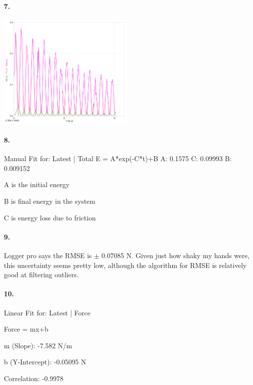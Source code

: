     \paragraph*{7.}\hbox{}

    \begin{center}
        \includegraphics[width=0.5\textwidth]{image21.png}
    \end{center}

    \paragraph*{8.}\hbox{}
    
    Manual Fit for: Latest | Total 
    E = A*exp(-C*t)+B
    A: 0.1575
    C: 0.09993
    B: 0.009152

    A is the initial energy 

    B is final energy in the system

    C is energy loss due to friction

    \paragraph*{9.}

    Logger pro says the RMSE  is $\pm$ 0.07085 N. Given just how shaky my hands were, this uncertainty seems pretty low, although the algorithm for RMSE is relatively good at filtering outliers. 

    \paragraph*{10.}

    Linear Fit for: Latest | Force 

    Force = mx+b

    m (Slope): -7.582 N/m

    b (Y-Intercept): -0.05095 N

    Correlation: -0.9978

